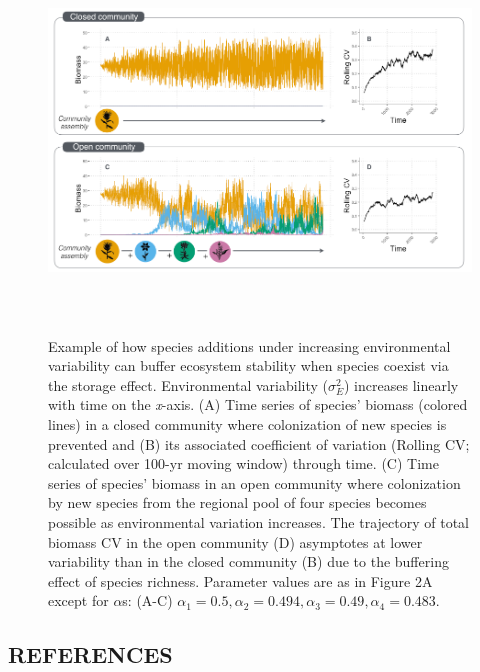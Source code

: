 \documentclass[12pt,]{article}
\begin{document}
\begin{figure}[!ht]
  \centering
      \includegraphics[height=4in]{./components/coexistence_stability_infographic_v2.png}
  \caption{Example of how species additions under increasing environmental variability can buffer ecosystem stability when species coexist via the storage effect. Environmental variability ($\sigma^2_E$) increases linearly with time on the \emph{x}-axis. (A) Time series of species' biomass (colored lines) in a closed community where colonization of new species is prevented and (B) its associated coefficient of variation (Rolling CV; calculated over 100-yr moving window) through time. (C) Time series of species' biomass in an open community where colonization by new species from the regional pool of four species becomes possible as environmental variation increases. The trajectory of total biomass CV in the open community (D) asymptotes at lower variability than in the closed community (B) due to the buffering effect of species richness. Parameter values are as in Figure 2A except for $\alpha$s: (A-C) $\alpha_1 = 0.5, \alpha_2 = 0.494, \alpha_3 = 0.49, \alpha_4 = 0.483$.}
\end{figure}

\newpage{}

\setlength{\parindent}{0ex} \singlespacing

\subsection*{REFERENCES}\label{references}
\end{document}
